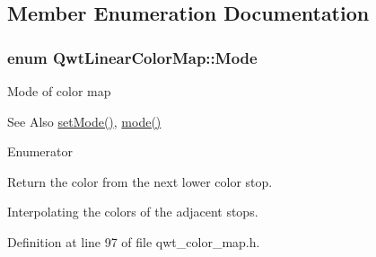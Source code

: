\subsection{Member Enumeration Documentation}
\hypertarget{class_qwt_linear_color_map_ac8c5f1991f533b1d25a9a0a0874b7d54}{
\subsubsection[{Mode}]{\setlength{\rightskip}{0pt plus 5cm}enum {\bf Qwt\-Linear\-Color\-Map\-::\-Mode}}}\label{class_qwt_linear_color_map_ac8c5f1991f533b1d25a9a0a0874b7d54}
Mode of color map \begin{DoxySeeAlso}{See Also}
\hyperlink{class_qwt_linear_color_map_afca7397fb6d07d05bab83e83e274a9c2}{set\-Mode()}, \hyperlink{class_qwt_linear_color_map_a9ec309df6ec88472a63b14ac2c692c96}{mode()} 
\end{DoxySeeAlso}
\begin{Desc}
\item[Enumerator]\par
\begin{description}
\item[{\em 
\hypertarget{class_qwt_linear_color_map_ac8c5f1991f533b1d25a9a0a0874b7d54a564b5243ab2c5e4c972a6b645234c651}{Fixed\-Colors}\label{class_qwt_linear_color_map_ac8c5f1991f533b1d25a9a0a0874b7d54a564b5243ab2c5e4c972a6b645234c651}
}]Return the color from the next lower color stop. \item[{\em 
\hypertarget{class_qwt_linear_color_map_ac8c5f1991f533b1d25a9a0a0874b7d54a01770189cb40240f2fe7fe2e6c1523f1}{Scaled\-Colors}\label{class_qwt_linear_color_map_ac8c5f1991f533b1d25a9a0a0874b7d54a01770189cb40240f2fe7fe2e6c1523f1}
}]Interpolating the colors of the adjacent stops. \end{description}
\end{Desc}


Definition at line 97 of file qwt\-\_\-color\-\_\-map.\-h.



